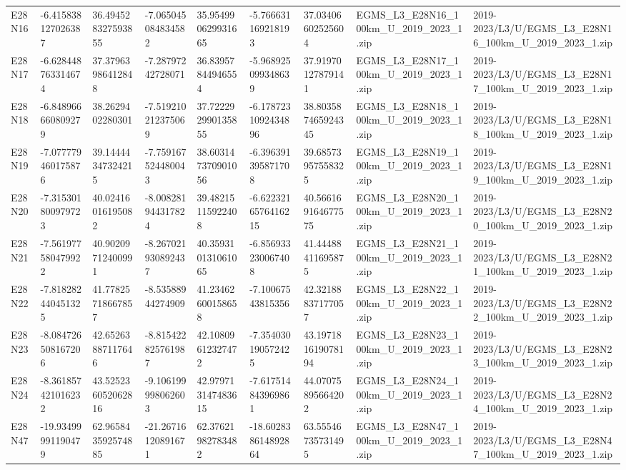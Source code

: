 \begin{landscape}
\begin{longtable}{lllllllll}
E28N16 & -6.415838127026387 & 36.494528327593855 & -7.065045084834582 & 35.954990629931665 & -5.766631169218193 & 37.03406602525604 & EGMS\_L3\_E28N16\_100km\_U\_2019\_2023\_1.zip & 2019-2023/L3/U/EGMS\_L3\_E28N16\_100km\_U\_2019\_2023\_1.zip \\
E28N17 & -6.628448763314674 & 37.37963986412848 & -7.28797242728071 & 36.83957844946554 & -5.968925099348639 & 37.91970127879141 & EGMS\_L3\_E28N17\_100km\_U\_2019\_2023\_1.zip & 2019-2023/L3/U/EGMS\_L3\_E28N17\_100km\_U\_2019\_2023\_1.zip \\
E28N18 & -6.848966660809279 & 38.2629402280301 & -7.519210212375069 & 37.722292990135855 & -6.1787231092434896 & 38.803587465924345 & EGMS\_L3\_E28N18\_100km\_U\_2019\_2023\_1.zip & 2019-2023/L3/U/EGMS\_L3\_E28N18\_100km\_U\_2019\_2023\_1.zip \\
E28N19 & -7.077779460175876 & 39.14444347324215 & -7.759167524480043 & 38.603147370901056 & -6.396391395871708 & 39.68573957558325 & EGMS\_L3\_E28N19\_100km\_U\_2019\_2023\_1.zip & 2019-2023/L3/U/EGMS\_L3\_E28N19\_100km\_U\_2019\_2023\_1.zip \\
E28N20 & -7.315301800979723 & 40.02416016195082 & -8.008281944317824 & 39.48215115922408 & -6.6223216576416215 & 40.566169164677575 & EGMS\_L3\_E28N20\_100km\_U\_2019\_2023\_1.zip & 2019-2023/L3/U/EGMS\_L3\_E28N20\_100km\_U\_2019\_2023\_1.zip \\
E28N21 & -7.561977580479922 & 40.90209712400991 & -8.267021930892437 & 40.359310131061065 & -6.856933230067408 & 41.44488411695875 & EGMS\_L3\_E28N21\_100km\_U\_2019\_2023\_1.zip & 2019-2023/L3/U/EGMS\_L3\_E28N21\_100km\_U\_2019\_2023\_1.zip \\
E28N22 & -7.818282440451325 & 41.77825718667857 & -8.53588944274909 & 41.23462600158658 & -7.10067543815356 & 42.32188837177057 & EGMS\_L3\_E28N22\_100km\_U\_2019\_2023\_1.zip & 2019-2023/L3/U/EGMS\_L3\_E28N22\_100km\_U\_2019\_2023\_1.zip \\
E28N23 & -8.084726508167206 & 42.65263887117646 & -8.815422825761987 & 42.10809612327472 & -7.354030190572425 & 43.197181619078194 & EGMS\_L3\_E28N23\_100km\_U\_2019\_2023\_1.zip & 2019-2023/L3/U/EGMS\_L3\_E28N23\_100km\_U\_2019\_2023\_1.zip \\
E28N24 & -8.361857421016232 & 43.525236052062816 & -9.106199998062603 & 42.979713147483615 & -7.617514843969861 & 44.07075895664202 & EGMS\_L3\_E28N24\_100km\_U\_2019\_2023\_1.zip & 2019-2023/L3/U/EGMS\_L3\_E28N24\_100km\_U\_2019\_2023\_1.zip \\
E28N47 & -19.93499991190479 & 62.965843592574885 & -21.26716120891671 & 62.37621982783482 & -18.602838614892864 & 63.55546735731495 & EGMS\_L3\_E28N47\_100km\_U\_2019\_2023\_1.zip & 2019-2023/L3/U/EGMS\_L3\_E28N47\_100km\_U\_2019\_2023\_1.zip \\

\end{longtable}
\end{landscape}
